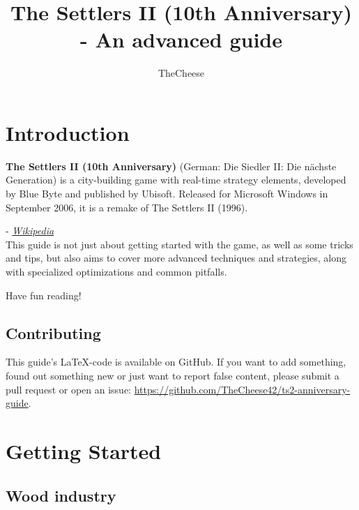 \documentclass[12pt]{article}
\title{\titlefont The Settlers II (10th Anniversary) - An advanced guide}
\author{TheCheese}
\date{}
\begin{document}
\maketitle

\vspace{2cm}

\begingroup
  \hypersetup{hidelinks}
  \tableofcontents
\endgroup


\section{Introduction}
\label{sec:introduction}

\begin{displayquote}
\textbf{The Settlers II (10th Anniversary)} (German: Die Siedler II: Die nächste Generation) is a city-building game with real-time strategy elements, developed by Blue Byte and published by Ubisoft. Released for Microsoft Windows in September 2006, it is a remake of The Settlers II (1996).
\end{displayquote}
\hspace{2cm}- \textit{\href{https://en.wikipedia.org/wiki/The_Settlers_II_(10th_Anniversary)}{Wikipedia}}\\

This guide is not just about getting started with the game, as well as some tricks and tips, but also aims to cover more advanced techniques and strategies, along with specialized optimizations and common pitfalls.

Have fun reading!

\subsection{Contributing}
\label{sec:contributing}

This guide's \LaTeX-code is available on GitHub. If you want to add something, found out something new or just want to report false content, please submit a pull request or open an issue: \url{https://github.com/TheCheese42/ts2-anniversary-guide}.

\section{Getting Started}
\label{sec:gettingstarted}

\subsection{Wood industry}
\label{sec:woodindustry}
\end{document}
